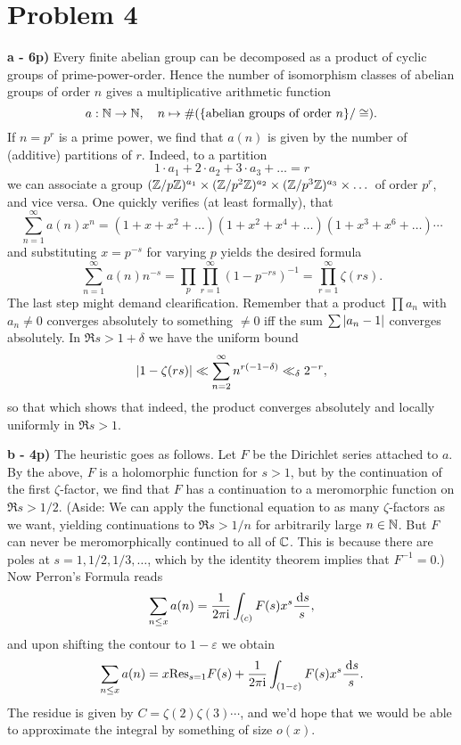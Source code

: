 \documentclass[a4paper,11pt]{article}
\begin{document}
\section*{Problem 4}
\textbf{a - 6p)} Every finite abelian group can be decomposed as a product of 
cyclic groups of prime-power-order. Hence the number of isomorphism classes 
of abelian groups of order $n$ gives a multiplicative arithmetic function
$$a: \mathbb{N} \to \mathbb{N}, \quad n \mapsto \#(\{\text{abelian groups of order
$n$}\}/\cong).$$ 
If $n = p^r$ is a prime power, we find that $a(n)$ is given by the number of 
(additive) partitions of $r$. Indeed, to a partition
\[
    1 \cdot a_1 + 2\cdot a_2 + 3 \cdot a_3 + \dots  = r 
\]
we can associate a group $(\mathbb{Z}/p\mathbb{Z})^{a_1} \times (\mathbb{Z}/p^{2}\mathbb{Z})^{a_2} \times
(\mathbb{Z}/p^3\mathbb{Z})^{a_3} \times \dots$ of order $p^r$, and vice versa. One quickly verifies
(at least formally), that
\[
    \sum_{n=1}^\infty a(n) x^n = (1+x+x^2+\dots) (1+x^2+x^4+\dots) 
    (1+x^3+x^6+\dots)\cdots
\]
and substituting $x=p^{-s}$ for varying $p$ yields the desired formula
\[
    \sum_{n=1}^\infty a(n) n^{-s} = \prod_{p} \prod_{r=1}^\infty(1-p^{-rs})^{-1}
    = \prod_{r=1}^\infty \zeta(rs).
\]
The last step might demand clearification. Remember that a product $\prod a_n$
with $a_n \neq 0$ converges absolutely to something $\neq 0$ iff the sum $\sum
\left\lvert a_n-1 \right\rvert$ converges absolutely. In $\Re s > 1+\delta$ we have the uniform
bound
\[
    \left\lvert 1-\zeta(rs) \right\rvert \ll \sum_{n=2}^\infty n^{r(-1-\delta)} \ll_\delta 2^{-r},
\]
so that 
which shows that indeed, the product converges absolutely and locally uniformly in
$\Re s > 1$. 

\textbf{b - 4p)} The heuristic goes as follows. Let $F$ be the Dirichlet series attached
to $a$. By the above, $F$ is a holomorphic function for $s > 1$, but by 
the continuation of the first $\zeta$-factor, we find that $F$ has a
continuation to a meromorphic function on $\Re s > 1/2$. (Aside: We can apply
the functional equation to as many $\zeta$-factors as we want, yielding
continuations to $\Re s > 1/n$ for arbitrarily large $n \in \mathbb{N}$. But $F$ can
never be meromorphically continued to all of $\mathbb{C}$. This is because there are
poles at $s=1, 1/2, 1/3, \dots$, which by the identity theorem implies that
$F^{-1}=0$.) Now Perron's Formula reads
\[
    \sum_{n \leq x} a(n) = \frac{1}{2 \pi \mathrm i} \int_{(c)} F(s) x^s \frac{\mathrm{\,d} s}s,
\]
and upon shifting the contour to $1-\varepsilon$ we obtain
\[
    \sum_{n \leq x}a(n) = x\text{Res}_{s=1} F(s) + \frac{1}{2 \pi \mathrm i} \int_{(1-\varepsilon)}
    F(s)x^s \frac{\mathrm{\,d} s}s.
\]
The residue is given by $C = \zeta(2) \zeta(3) \cdots$, and we'd hope that we would be able to approximate the integral by something of size 
$o(x)$.
\end{document}
